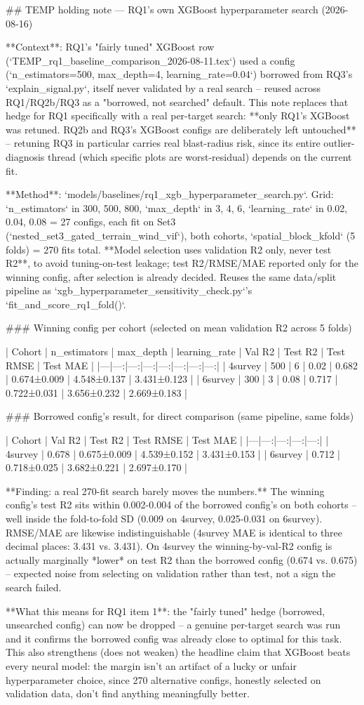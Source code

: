 ## TEMP holding note — RQ1's own XGBoost hyperparameter search (2026-08-16)

**Context**: RQ1's "fairly tuned" XGBoost row (`TEMP_rq1_baseline_comparison_2026-08-11.tex`) used
a config (`n_estimators=500, max_depth=4, learning_rate=0.04`) borrowed from RQ3's
`explain_signal.py`, itself never validated by a real search -- reused across RQ1/RQ2b/RQ3 as a
"borrowed, not searched" default. This note replaces that hedge for RQ1 specifically with a real
per-target search: **only RQ1's XGBoost was retuned. RQ2b and RQ3's XGBoost configs are
deliberately left untouched** -- retuning RQ3 in particular carries real blast-radius risk, since
its entire outlier-diagnosis thread (which specific plots are worst-residual) depends on the
current fit.

**Method**: `models/baselines/rq1_xgb_hyperparameter_search.py`. Grid: `n_estimators` in
{300, 500, 800}, `max_depth` in {3, 4, 6}, `learning_rate` in {0.02, 0.04, 0.08} = 27 configs,
each fit on Set3 (`nested_set3_gated_terrain_wind_vif`), both cohorts, `spatial_block_kfold`
(5 folds) = 270 fits total. **Model selection uses validation R2 only, never test R2**, to avoid
tuning-on-test leakage; test R2/RMSE/MAE reported only for the winning config, after selection is
already decided. Reuses the same data/split pipeline as
`xgb_hyperparameter_sensitivity_check.py`'s `fit_and_score_rq1_fold()`.

### Winning config per cohort (selected on mean validation R2 across 5 folds)

| Cohort | n_estimators | max_depth | learning_rate | Val R2 | Test R2 | Test RMSE | Test MAE |
|---|---:|---:|---:|---:|---:|---:|---:|
| 4survey | 500 | 6 | 0.02 | 0.682 | 0.674±0.009 | 4.548±0.137 | 3.431±0.123 |
| 6survey | 300 | 3 | 0.08 | 0.717 | 0.722±0.031 | 3.656±0.232 | 2.669±0.183 |

### Borrowed config's result, for direct comparison (same pipeline, same folds)

| Cohort | Val R2 | Test R2 | Test RMSE | Test MAE |
|---|---:|---:|---:|---:|
| 4survey | 0.678 | 0.675±0.009 | 4.539±0.152 | 3.431±0.153 |
| 6survey | 0.712 | 0.718±0.025 | 3.682±0.221 | 2.697±0.170 |

**Finding: a real 270-fit search barely moves the numbers.** The winning config's test R2 sits
within 0.002-0.004 of the borrowed config's on both cohorts -- well inside the fold-to-fold SD
(0.009 on 4survey, 0.025-0.031 on 6survey). RMSE/MAE are likewise indistinguishable (4survey MAE
is identical to three decimal places: 3.431 vs. 3.431). On 4survey the winning-by-val-R2 config is
actually marginally *lower* on test R2 than the borrowed config (0.674 vs. 0.675) -- expected
noise from selecting on validation rather than test, not a sign the search failed.

**What this means for RQ1 item 1**: the "fairly tuned" hedge (borrowed, unsearched config) can now
be dropped -- a genuine per-target search was run and it confirms the borrowed config was already
close to optimal for this task. This also strengthens (does not weaken) the headline claim that
XGBoost beats every neural model: the margin isn't an artifact of a lucky or unfair hyperparameter
choice, since 270 alternative configs, honestly selected on validation data, don't find anything
meaningfully better.
